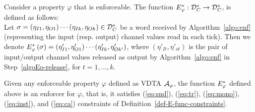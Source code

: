 \begin{definition}[$\efalgo$]
	\label{def-algo-ef}
	Consider a property $\varphi$ that is enforceable. 
	The function ${E_{\varphi}^*}:{\mathcal D}_C^*\to{\mathcal D}_C^*$,  is defined as follows:\\
	Let $\sigma = \left(\eta_{I1}, \eta_{O1}\right) \cdots \left(\eta_{Ik}, \eta_{Ok}\right)\in{\mathcal D}_C^*$ be a word received by
	Algorithm~\ref{algo:enf} (representing the input (resp. output) channel values read in each tick). Then we denote
	${E_{\varphi}^*}\left(\sigma\right)=\left(\eta'_{I1}, \eta'_{O1}\right) \cdots \left(\eta'_{Ik}, \eta'_{Ok'}\right)$, where $\left(\eta'_{It},\eta'_{ot}\right)$ is the
	pair of input/output channel values released as output by Algorithm~\ref{algo:enf} in Step~\ref{algoEo-release},
	for $t=1,...,k$.
\end{definition}

\begin{prop}
	\label{prop-constraints-algo}
	Given any enforceable property $\varphi$ defined as VDTA ${\mathcal A}_\varphi$,
	the function $\efalgo$ defined above is an enforcer for $\varphi$, that is,
	it satisfies (\ref{eq:snd}), (\ref{eq:tr}), (\ref{eq:mono}), (\ref{eq:inst}), and (\ref{eq:ca}) constraints of Definition~\ref{def-E-func-constraints}.
\end{prop}
